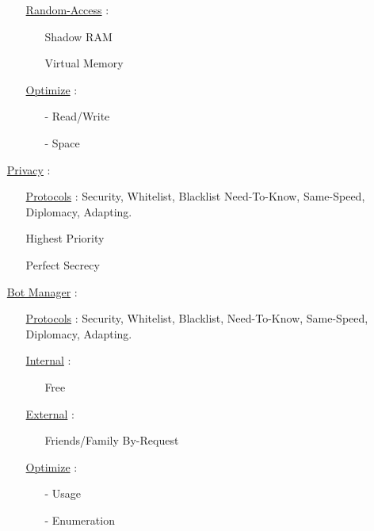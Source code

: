 \documentclass[11pt]{article}
\begin{document}
\begin{enumerate}
\begin{enumerate}
		\item[] \ul{Random-Access} :
		\begin{enumerate}
			\item[] Shadow RAM
			\item[] Virtual Memory
		\end{enumerate}
		
		\item[] \ul{Optimize}  :
		\begin{enumerate}
			\item[-] Read/Write
			\item[-] Space
		\end{enumerate}
	\end{enumerate}

	\item[] \ul{Privacy} :
	\begin{enumerate}
		\item[] \ul{Protocols} : Security, Whitelist, Blacklist Need-To-Know, Same-Speed, Diplomacy,  Adapting.
		\item[] Highest Priority
		\item[] Perfect Secrecy
	\end{enumerate}
	
	\item[] \ul{Bot Manager} :
	\begin{enumerate}
		\item[] \ul{Protocols} : Security, Whitelist, Blacklist, Need-To-Know, Same-Speed, Diplomacy,  Adapting.
		
		\item[] \ul{Internal}  :
		\begin{enumerate}
			\item[] Free
		\end{enumerate}
	
		\item[] \ul{External} :
		\begin{enumerate}
			\item[] Friends/Family By-Request
		\end{enumerate}

		\item[] \ul{Optimize}  :
		\begin{enumerate}
			\item[-] Usage
			\item[-] Enumeration
		\end{enumerate}
	\end{enumerate}
\end{enumerate}
\end{document}
